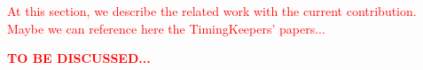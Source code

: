 \textcolor{red}{At this section, we describe the related work with the current contribution. Maybe we can reference here the TimingKeepers' papers... }
	
	
\textcolor{red}{\textbf{TO BE DISCUSSED...}}

